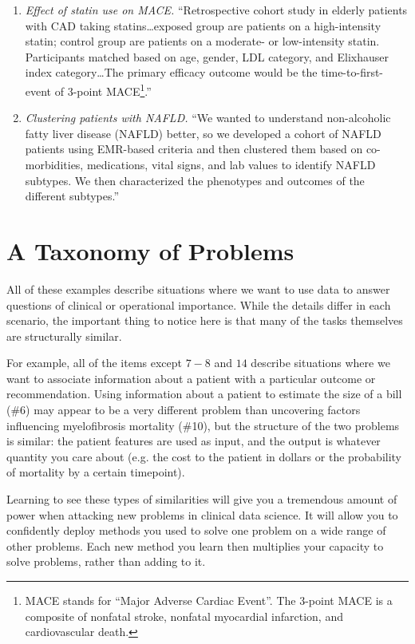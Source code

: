 \begin{enumerate}
\item \textit{Effect of statin use on MACE.} ``Retrospective cohort study in elderly patients with CAD taking statins\dots exposed group are patients on a high-intensity statin; control group are patients on a moderate- or low-intensity statin. Participants matched based on age, gender, LDL category, and Elixhauser index category\dots The primary efficacy outcome would be the time-to-first-event of 3-point MACE\footnote{MACE stands for ``Major Adverse Cardiac Event''. The 3-point MACE is a composite of nonfatal stroke, nonfatal myocardial infarction, and cardiovascular death.}.''
\item \textit{Clustering patients with NAFLD.} ``We wanted to understand non-alcoholic fatty liver disease (NAFLD) better, so we developed a cohort of NAFLD patients using EMR-based criteria and then clustered them based on co-morbidities, medications, vital signs, and lab values to identify NAFLD subtypes. We then characterized the phenotypes and outcomes of the different subtypes.''
\end{enumerate}


\section{A Taxonomy of Problems}

All of these examples describe situations where we want to use data to answer questions of clinical or operational importance. While the details differ in each scenario, the important thing to notice here is that many of the tasks themselves are structurally similar. 

For example, all of the items except $7-8$ and $14$ describe situations where we want to associate information about a patient with a particular outcome or recommendation. Using information about a patient to estimate the size of a bill (\#6) may appear to be a very different problem than uncovering factors influencing myelofibrosis mortality (\#10), but the structure of the two problems is similar: the patient features are used as input, and the output is whatever quantity you care about (e.g. the cost to the patient in dollars or the probability of mortality by a certain timepoint). 

Learning to see these types of similarities will give you a tremendous amount of power when attacking new problems in clinical data science. It will allow you to confidently deploy methods you used to solve one problem on a wide range of other problems. Each new method you learn then multiplies your capacity to solve problems, rather than adding to it. 

